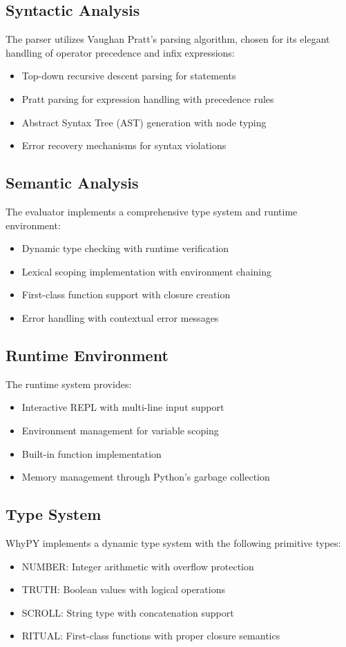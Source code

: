\documentclass[conference]{IEEEtran}
\begin{document}
\subsection{Syntactic Analysis}
The parser utilizes Vaughan Pratt's parsing algorithm, chosen for its elegant handling of operator precedence and infix expressions:
\begin{itemize}
    \item Top-down recursive descent parsing for statements
    \item Pratt parsing for expression handling with precedence rules
    \item Abstract Syntax Tree (AST) generation with node typing
    \item Error recovery mechanisms for syntax violations
\end{itemize}

\subsection{Semantic Analysis}
The evaluator implements a comprehensive type system and runtime environment:
\begin{itemize}
    \item Dynamic type checking with runtime verification
    \item Lexical scoping implementation with environment chaining
    \item First-class function support with closure creation
    \item Error handling with contextual error messages
\end{itemize}

\subsection{Runtime Environment}
The runtime system provides:
\begin{itemize}
    \item Interactive REPL with multi-line input support
    \item Environment management for variable scoping
    \item Built-in function implementation
    \item Memory management through Python's garbage collection
\end{itemize}

\subsection{Type System}
WhyPY implements a dynamic type system with the following primitive types:
\begin{itemize}
    \item NUMBER: Integer arithmetic with overflow protection
    \item TRUTH: Boolean values with logical operations
    \item SCROLL: String type with concatenation support
    \item RITUAL: First-class functions with proper closure semantics
\end{itemize}
\end{document}
